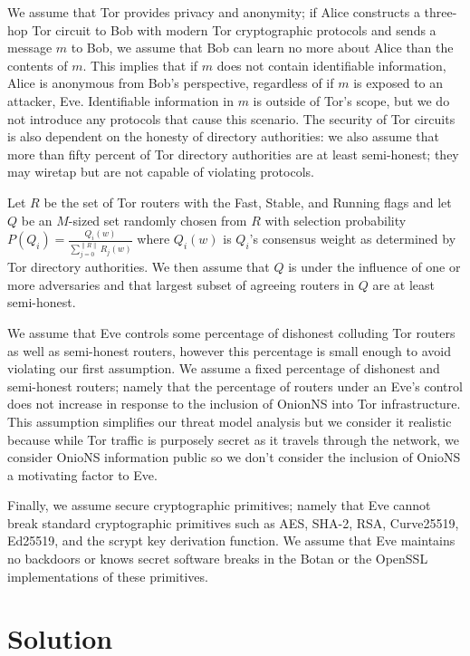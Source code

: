 \documentclass[conference]{IEEEtran}
\newcommand*\concat{\mathbin{\|}}
\begin{document}
We assume that Tor provides privacy and anonymity; if Alice constructs a three-hop Tor circuit to Bob with modern Tor cryptographic protocols and sends a message $ m $ to Bob, we assume that Bob can learn no more about Alice than the contents of $ m $. This implies that if $ m $ does not contain identifiable information, Alice is anonymous from Bob's perspective, regardless of if $ m $ is exposed to an attacker, Eve. Identifiable information in $ m $ is outside of Tor's scope, but we do not introduce any protocols that cause this scenario. The security of Tor circuits is also dependent on the honesty of directory authorities: we also assume that more than fifty percent of Tor directory authorities are at least semi-honest; they may wiretap but are not capable of violating protocols. 

Let $ R $ be the set of Tor routers with the Fast, Stable, and Running flags and let $ Q $ be an $ M $-sized set randomly chosen from $ R $ with selection probability $ P (Q_{i}) = \frac{Q_{i}(w)}{\sum_{j=0}^{\| R \|} R_{j}(w)} $ where $ Q_{i}(w) $ is $ Q_{i} $'s consensus weight as determined by Tor directory authorities. We then assume that $ Q $ is under the influence of one or more adversaries and that largest subset of agreeing routers in $ Q $ are at least semi-honest.


We assume that Eve controls some percentage of dishonest colluding Tor routers as well as semi-honest routers, however this percentage is small enough to avoid violating our first assumption. We assume a fixed percentage of dishonest and semi-honest routers; namely that the percentage of routers under an Eve's control does not increase in response to the inclusion of OnionNS into Tor infrastructure. This assumption simplifies our threat model analysis but we consider it realistic because while Tor traffic is purposely secret as it travels through the network, we consider OnioNS information public so we don't consider the inclusion of OnioNS a motivating factor to Eve.

Finally, we assume secure cryptographic primitives; namely that Eve cannot break standard cryptographic primitives such as AES, SHA-2, RSA, Curve25519, Ed25519, and the scrypt key derivation function. We assume that Eve maintains no backdoors or knows secret software breaks in the Botan or the OpenSSL implementations of these primitives.

\section{Solution}
\label{sec:Solution}
\end{document}
